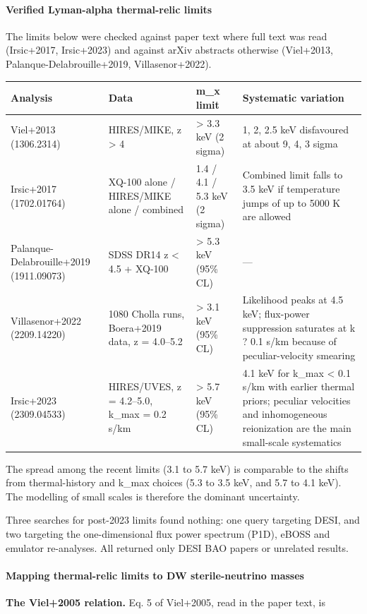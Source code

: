 \documentclass[11pt,a4paper]{article}
\begin{document}
\paragraph{Verified Lyman-alpha thermal-relic limits}
The limits below were checked against paper text where full text was read (Irsic+2017, Irsic+2023) and against arXiv abstracts otherwise (Viel+2013, Palanque-Delabrouille+2019, Villasenor+2022).

\begin{longtable}{@{}p{}p{}p{}p{}@{}}
\toprule
\textbf{Analysis} & \textbf{Data} & \textbf{m\_x limit} & \textbf{Systematic variation} \\ \midrule \endhead
Viel+2013 (1306.2314) & HIRES/MIKE, z \textgreater{} 4 & \textgreater{} 3.3 keV (2 sigma) & 1, 2, 2.5 keV disfavoured at about 9, 4, 3 sigma \\
Irsic+2017 (1702.01764) & XQ-100 alone / HIRES/MIKE alone / combined & 1.4 / 4.1 / 5.3 keV (2 sigma) & Combined limit falls to 3.5 keV if temperature jumps of up to 5000 K are allowed \\
Palanque-Delabrouille+2019 (1911.09073) & SDSS DR14 z \textless{} 4.5 + XQ-100 & \textgreater{} 5.3 keV (95\% CL) & --- \\
Villasenor+2022 (2209.14220) & 1080 Cholla runs, Boera+2019 data, z = 4.0--5.2 & \textgreater{} 3.1 keV (95\% CL) & Likelihood peaks at 4.5 keV; flux-power suppression saturates at k ? 0.1 s/km because of peculiar-velocity smearing \\
Irsic+2023 (2309.04533) & HIRES/UVES, z = 4.2--5.0, k\_max = 0.2 s/km & \textgreater{} 5.7 keV (95\% CL) & 4.1 keV for k\_max \textless{} 0.1 s/km with earlier thermal priors; peculiar velocities and inhomogeneous reionization are the main small-scale systematics \\
\bottomrule\end{longtable}
The spread among the recent limits (3.1 to 5.7 keV) is comparable to the shifts from thermal-history and k\_max choices (5.3 to 3.5 keV, and 5.7 to 4.1 keV). The modelling of small scales is therefore the dominant uncertainty.

Three searches for post-2023 limits found nothing: one query targeting DESI, and two targeting the one-dimensional flux power spectrum (P1D), eBOSS and emulator re-analyses. All returned only DESI BAO papers or unrelated results.

\paragraph{Mapping thermal-relic limits to DW sterile-neutrino masses}
\textbf{The Viel+2005 relation.} Eq. 5 of Viel+2005, read in the paper text, is
\end{document}
